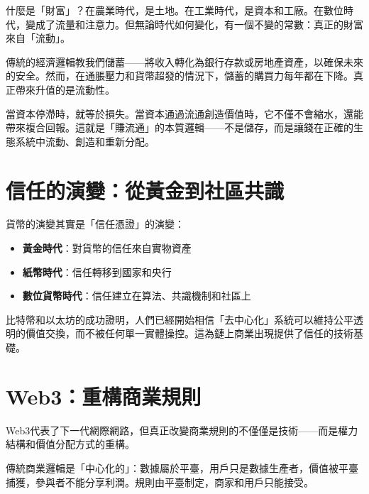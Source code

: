 \documentclass[
  Letterpaper,
]{scrbook}
\providecommand{\tightlist}{%
  \setlength{\itemsep}{0pt}\setlength{\parskip}{0pt}}
\begin{document}

什麼是「財富」？在農業時代，是土地。在工業時代，是資本和工廠。在數位時代，變成了流量和注意力。但無論時代如何變化，有一個不變的常數：真正的財富來自「流動」。

傳統的經濟邏輯教我們儲蓄------將收入轉化為銀行存款或房地產資產，以確保未來的安全。然而，在通脹壓力和貨幣超發的情況下，儲蓄的購買力每年都在下降。真正帶來升值的是流動性。

當資本停滯時，就等於損失。當資本通過流通創造價值時，它不僅不會縮水，還能帶來複合回報。這就是「賺流通」的本質邏輯------不是儲存，而是讓錢在正確的生態系統中流動、創造和重新分配。

\section*{信任的演變：從黃金到社區共識}\label{ux4fe1ux4efbux7684ux6f14ux8b8aux5f9eux9ec3ux91d1ux5230ux793eux5340ux5171ux8b58}


貨幣的演變其實是「信任憑證」的演變：

\begin{itemize}
\tightlist
\item
  \textbf{黃金時代}：對貨幣的信任來自實物資產
\item
  \textbf{紙幣時代}：信任轉移到國家和央行
\item
  \textbf{數位貨幣時代}：信任建立在算法、共識機制和社區上
\end{itemize}

比特幣和以太坊的成功證明，人們已經開始相信「去中心化」系統可以維持公平透明的價值交換，而不被任何單一實體操控。這為鏈上商業出現提供了信任的技術基礎。

\section*{Web3：重構商業規則}\label{web3ux91cdux69cbux5546ux696dux898fux5247}


Web3代表了下一代網際網路，但真正改變商業規則的不僅僅是技術------而是權力結構和價值分配方式的重構。

傳統商業邏輯是「中心化的」：數據屬於平臺，用戶只是數據生產者，價值被平臺捕獲，參與者不能分享利潤。規則由平臺制定，商家和用戶只能接受。
\end{document}

